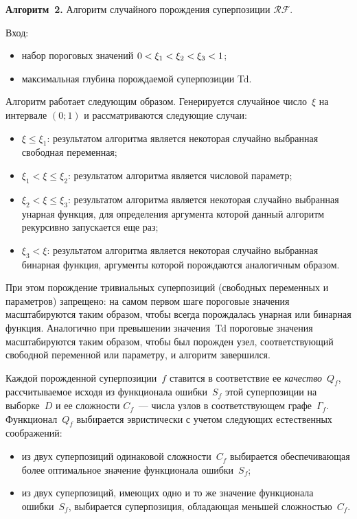 \begin{multicols}{2}
\smallskip

\noindent
\textbf{Алгоритм~2.} 
  Алгоритм случайного порождения суперпозиции $\mathcal{RF}$.

  Вход:
  \begin{itemize}
    \item набор пороговых значений $0 < \xi_1 < \xi_2 \hm< \xi_3 \hm< 1$;
    \item максимальная глубина порождаемой суперпозиции Td.
  \end{itemize}


\smallskip

Алгоритм работает следующим образом. Генерируется случайное чис\-ло~$\xi$ на
интервале $(0; 1)$ и рассматриваются следующие случаи:
\begin{itemize}
  \item $\xi \leq \xi_1$: результатом алгоритма является некоторая случайно
    выбранная свободная переменная;
  \item $\xi_1 < \xi \leq \xi_2$: результатом алгоритма является    числовой
    параметр;
  \item $\xi_2 < \xi \leq \xi_3$: результатом алгоритма является некоторая
    случайно выбранная унарная функция, для определения аргумента которой
    данный алгоритм рекурсивно запускается еще раз;
  \item $\xi_3 < \xi$: результатом алгоритма является некоторая случайно
    выбранная бинарная функция, аргументы которой порождаются аналогичным
    образом.
\end{itemize}
При этом порождение тривиальных суперпозиций (свободных переменных и
параметров) запрещено: на самом первом шаге пороговые значения масштабируются
таким образом, чтобы всегда порождалась унарная или бинарная функция.
Аналогично при превышении значения~Td пороговые значения масштабируются
таким образом, чтобы был порожден узел, соответствующий свободной переменной
или параметру, и алгоритм за\-вер\-шился.

Каждой порожденной суперпозиции~$f$ ставится в
соответствие ее \textit{качество}~$Q_f$, рассчитываемое исходя из функционала ошибки~$S_f$ 
этой суперпозиции на выборке~$D$ и ее сложности $C_f$~---
числа узлов в соответствующем графе~$\Gamma_f$. Функционал~$Q_f$ выбирается эвристически
с учетом следующих естественных соображений:
\begin{itemize}
  \item из двух суперпозиций одинаковой слож\-ности~$C_f$ выбирается обеспечивающая
    более оптимальное значение функционала ошибки~$S_f$;
  \item из двух суперпозиций, имеющих одно и то же значение функционала ошибки~$S_f$,
    выбирается суперпозиция, обладающая меньшей слож\-ностью~$C_f$.
\end{itemize}


\end{multicols}
